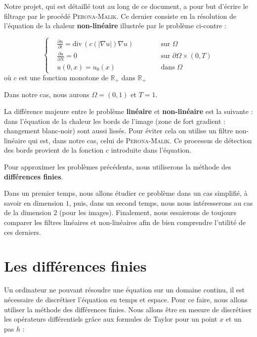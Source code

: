 \documentclass[a4paper,12pt,twoside]{report}
\newcommand{\R}{\mathbb{R}}
\newcommand{\1}{\mathbb{1}}
\renewcommand{\div}{\mathrm{div}\,}
\begin{document}
	Notre projet, qui est détaillé tout au long de ce document, a pour but d'écrire le filtrage par le procédé \textsc{Perona-Malik}. Ce dernier consiste en la résolution de l'équation de la chaleur \textbf{non-linéaire} illustrée par le problème ci-contre : 
	
	\begin{equation*}
	\left\{
	\begin{aligned}
	&\frac{\partial u}{\partial t} = \div\left(c\left(\left|\nabla u\right|\right)\nabla u\right) &\qquad &\text{ sur } \Omega \\
	&\frac{\partial u}{\partial N} = 0 &\qquad &\text{ sur } \partial \Omega \times \left(0,T\right) \\
	&u(0,x) = u_0(x) &\qquad &\text{ dans } \Omega 
	\end{aligned}
	\right.
	\end{equation*}
	où $c$ est une fonction monotone de $\R_+$ dans $\R_+$
	
	Dans notre cas, nous aurons $\Omega =\left(0,1\right)$ et $T = 1$. 
	
	La différence majeure entre le problème \textbf{linéaire} et \textbf{non-linéaire} est la suivante : dans l'équation de la chaleur les bords de l'image (zone de fort gradient : changement blanc-noir) sont aussi lissés. Pour éviter cela on utilise un filtre non-linéaire qui est, dans notre cas, celui de  \textsc{Perona-Malik}. Ce processus de détection des bords provient de la fonction $c$ introduite dans l'équation. 
	
	Pour approximer les problèmes précédents, nous utiliserons la méthode des \textbf{différences finies}.
	

	Dans un premier temps, nous allons étudier ce problème dans un cas simplifié, à savoir en dimension $1$, puis, dans un second temps, nous nous intéresserons au cas de la dimension $2$ (pour les images). Finalement, nous essaierons de toujours comparer les filtres linéaires et non-linéaires afin de bien comprendre l'utilité de ces derniers.
	
	\section{Les différences finies}
	
	Un ordinateur ne pouvant résoudre une équation sur un domaine continu, il est nécessaire de discrétiser l'équation en temps et espace. Pour ce faire, nous allons utiliser la méthode des différences finies. Nous allons être en mesure de discrétiser les opérateurs différentiels grâce aux formules de Taylor pour un point $x$ et un pas $h$ :
	
\end{document}
